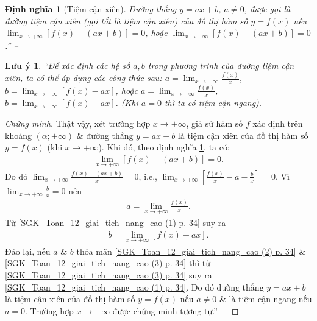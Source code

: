 \documentclass[oneside]{book}
\numberwithin{equation}{section}
\newtheorem{dinhnghia}{Định nghĩa}[section]
\newtheorem{luuy}{Lưu ý}[section]
\begin{document}
\begin{dinhnghia}[Tiệm cận xiên]
	\label{def:tiem can xien}
	Đường thẳng $y = ax + b$, $a\ne 0$, được gọi là \emph{đường tiệm cận xiên} (gọi tắt là \emph{tiệm cận xiên}) của đồ thị hàm số $y = f(x)$ nếu $\lim_{x\to+\infty} [f(x) - (ax + b)] = 0$, hoặc $\lim_{x\to-\infty} [f(x) - (ax + b)] = 0$.'' -- \cite[p. 32]{SGK_Toan_12_giai_tich_nang_cao}
\end{dinhnghia}

\begin{luuy}
	``Để xác định các hệ số $a,b$ trong phương trình của đường tiệm cận xiên, ta có thể áp dụng các công thức sau: $a = \lim_{x\to+\infty} \frac{f(x)}{x}$, $b = \lim_{x\to+\infty} [f(x) - ax]$, hoặc $a = \lim_{x\to-\infty} \frac{f(x)}{x}$, $b = \lim_{x\to-\infty} [f(x) - ax]$. (Khi $a = 0$ thì ta có tiệm cận ngang).
\end{luuy}

\begin{proof}[Chứng minh]
	Thật vậy, xét trường hợp $x\to+\infty$, giả sử hàm số $f$ xác định trên khoảng $(\alpha;+\infty)$ \& đường thẳng $y = ax + b$ là tiệm cận xiên của đồ thị hàm số $y = f(x)$ (khi $x\to+\infty$). Khi đó, theo định nghĩa \ref{def:tiem can xien}, ta có:
	\begin{align}
		\label{SGK_Toan_12_giai_tich_nang_cao (1) p. 34}
		\lim_{x\to+\infty} [f(x) - (ax + b)] = 0.
	\end{align}
	Do đó $\lim_{x\to+\infty} \frac{f(x) - (ax + b)}{x} = 0$, i.e., $\lim_{x\to+\infty} \left[\frac{f(x)}{x} - a - \frac{b}{x}\right] = 0$. Vì $\lim_{x\to+\infty} \frac{b}{x} = 0$ nên
	\begin{align}
		\label{SGK_Toan_12_giai_tich_nang_cao (2) p. 34}
		a = \lim_{x\to+\infty} \frac{f(x)}{x}.
	\end{align}
	Từ \eqref{SGK_Toan_12_giai_tich_nang_cao (1) p. 34} suy ra
	\begin{align}
		\label{SGK_Toan_12_giai_tich_nang_cao (3) p. 34}
		b = \lim_{x\to+\infty} [f(x) - ax].
	\end{align}
	Đảo lại, nếu $a$ \& $b$ thỏa mãn \eqref{SGK_Toan_12_giai_tich_nang_cao (2) p. 34} \& \eqref{SGK_Toan_12_giai_tich_nang_cao (3) p. 34} thì từ \eqref{SGK_Toan_12_giai_tich_nang_cao (3) p. 34} suy ra \eqref{SGK_Toan_12_giai_tich_nang_cao (1) p. 34}. Do đó đường thẳng $y = ax + b$ là tiệm cận xiên của đồ thị hàm số $y = f(x)$ nếu $a\ne 0$ \& là tiệm cận ngang nếu $a = 0$. Trường hợp $x\to-\infty$ được chứng minh tương tự.'' -- \cite[p. 34]{SGK_Toan_12_giai_tich_nang_cao}
\end{proof}
\end{document}

